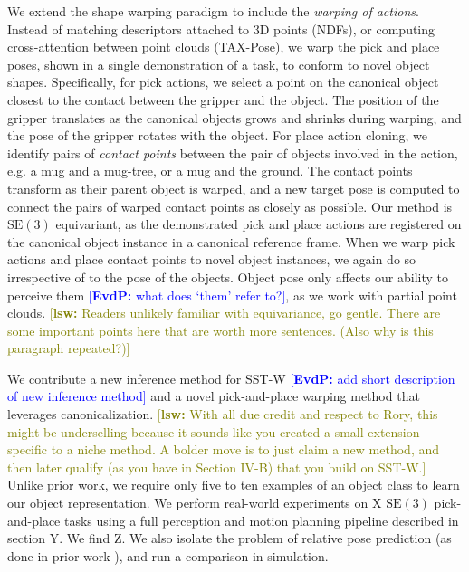 \documentclass{article}
\newcommand{\evdp}[1]{\textcolor{blue}{[\textbf{EvdP:} #1]}}
\newcommand{\lsw}[1]{\textcolor{olive}{[\textbf{lsw:} #1]}}
\begin{document}
We extend the shape warping paradigm to include the \textit{warping of actions}. Instead of matching descriptors attached to 3D points (NDFs), or computing cross-attention between point clouds (TAX-Pose), we warp the pick and place poses, shown in a single demonstration of a task, to conform to novel object shapes. Specifically, for pick actions, we select a point on the canonical object closest to the contact between the gripper and the object. The position of the gripper translates as the canonical objects grows and shrinks during warping, and the pose of the gripper rotates with the object. For place action cloning, we identify pairs of \textit{contact points} between the pair of objects involved in the action, e.g. a mug and a mug-tree, or a mug and the ground. The contact points transform as their parent object is warped, and a new target pose is computed to connect the pairs of warped contact points as closely as possible. Our method is $\mathrm{SE}(3)$ equivariant, as the demonstrated pick and place actions are registered on the canonical object instance in a canonical reference frame. When we warp pick actions and place contact points to novel object instances, we again do so irrespective of to the pose of the objects. Object pose only affects our ability to perceive them \evdp{what does `them' refer to?}, as we work with partial point clouds.
\lsw{Readers unlikely familiar with equivariance, go gentle. There are some important points here that are worth more sentences. (Also why is this paragraph repeated?)}

We contribute a new inference method for SST-W \cite{thompson21ShapeBased} \evdp{add short description of new inference method} and a novel pick-and-place warping method that leverages canonicalization.
\lsw{With all due credit and respect to Rory, this might be underselling because it sounds like you created a small extension specific to a niche method. A bolder move is to just claim a new method, and then later qualify (as you have in Section IV-B) that you build on SST-W.}
Unlike prior work, we require only five to ten examples of an object class to learn our object representation. We perform real-world experiments on X $\mathrm{SE}(3)$ pick-and-place tasks using a full perception and motion planning pipeline described in section Y. We find Z. We also isolate the problem of relative pose prediction (as done in prior work \cite{pan22TAXPose,simeonov22Neurala}), and run a comparison in simulation.

\end{document}
